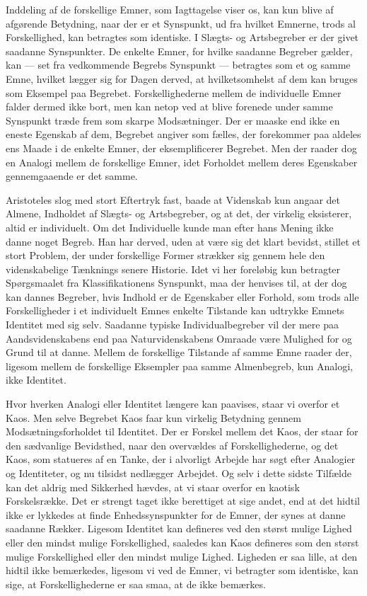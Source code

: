 \documentclass[12pt]{article}
\newcommand{\opage}[1]{\marginnote{\footnotesize\textit{[#1]}}}
\begin{document}
Inddeling af de forskellige Emner, som Iagttagelse viser
os, kan kun blive af afgørende Betydning, naar der er et
Synspunkt, ud fra hvilket Emnerne, trods al Forskellighed,
kan betragtes som identiske. I Slægts- og Artsbegreber
er der givet saadanne Synspunkter. De enkelte Emner, for
hvilke saadanne Begreber gælder, kan --- set fra vedkommende
Begrebs Synspunkt --- betragtes som et og samme
Emne, hvilket lægger sig for Dagen derved, at hvilketsomhelst
af dem kan bruges som Eksempel paa Begrebet.
Forskellighederne mellem de individuelle Emner falder dermed
ikke bort, men kan netop ved at blive forenede under
samme Synspunkt træde frem som skarpe Modsætninger.
Der er maaske end ikke en eneste Egenskab af
dem, Begrebet angiver som \guillemotright fælles\guillemotleft, der forekommer paa
\opage{35} aldeles ens Maade i de enkelte Emner, der eksemplificerer
Begrebet. Men der raader dog en Analogi mellem de forskellige
Emner, idet Forholdet mellem deres Egenskaber
gennemgaaende er det samme.

Aristoteles slog med stort Eftertryk fast, baade at Videnskab
kun angaar det Almene, Indholdet af Slægts- og
Artsbegreber, og at det, der virkelig eksisterer, altid er individuelt.
Om det Individuelle kunde man efter hans Mening
ikke danne noget Begreb. Han har derved, uden at
være sig det klart bevidst, stillet et stort Problem, der
under forskellige Former strækker sig gennem hele den
videnskabelige Tænknings senere Historie. Idet vi her foreløbig
kun betragter Spørgsmaalet fra Klassifikationens Synspunkt,
maa der henvises til, at der dog kan dannes Begreber,
hvis Indhold er de Egenskaber eller Forhold, som
trods alle Forskelligheder i et individuelt Emnes enkelte
Tilstande kan udtrykke Emnets Identitet med sig selv.
Saadanne typiske Individualbegreber vil der mere paa
Aandsvidenskabens end paa Naturvidenskabens Omraade
være Mulighed for og Grund til at danne. Mellem de forskellige
Tilstande af samme Emne raader der, ligesom
mellem de forskellige Eksempler paa samme Almenbegreb,
kun Analogi, ikke Identitet.

Hvor hverken Analogi eller Identitet længere kan paavises,
staar vi overfor et Kaos. Men selve Begrebet Kaos
faar kun virkelig Betydning gennem Modsætningsforholdet
til Identitet. Der er Forskel mellem det Kaos, der staar
for den sædvanlige Bevidsthed, naar den overvældes af
Forskellighederne, og det Kaos, som statueres af en Tanke,
der i alvorligt Arbejde har søgt efter Analogier og Identiteter,
og nu tilsidst nedlægger Arbejdet. Og selv i dette
sidste Tilfælde kan det aldrig med Sikkerhed hævdes, at
\opage{36} \setcounter{footnote}{0}
vi staar overfor en kaotisk Forskelsrække. Det er strengt
taget ikke berettiget at sige andet, end at det hidtil ikke
er lykkedes at finde Enhedssynspunkter for de Emner, der
synes at danne saadanne Rækker. Ligesom Identitet kan
defineres ved den størst mulige Lighed eller den mindst
mulige Forskellighed, saaledes kan Kaos defineres som den
størst mulige Forskellighed eller den mindst mulige Lighed.
Ligheden er saa lille, at den hidtil ikke bemærkedes,
ligesom vi ved de Emner, vi betragter som identiske, kan
sige, at Forskellighederne er saa smaa, at de ikke bemærkes.
\end{document}
